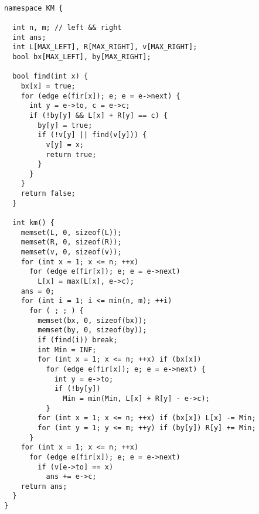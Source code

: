 \begin{lstlisting}

namespace KM {

  int n, m; // left && right
  int ans;
  int L[MAX_LEFT], R[MAX_RIGHT], v[MAX_RIGHT];
  bool bx[MAX_LEFT], by[MAX_RIGHT];

  bool find(int x) {
    bx[x] = true;
    for (edge e(fir[x]); e; e = e->next) {
      int y = e->to, c = e->c;
      if (!by[y] && L[x] + R[y] == c) {
        by[y] = true;
        if (!v[y] || find(v[y])) {
          v[y] = x;
          return true;
        }
      }
    }
    return false;
  }

  int km() {
    memset(L, 0, sizeof(L));
    memset(R, 0, sizeof(R));
    memset(v, 0, sizeof(v));
    for (int x = 1; x <= n; ++x)
      for (edge e(fir[x]); e; e = e->next)
        L[x] = max(L[x], e->c);
    ans = 0;
    for (int i = 1; i <= min(n, m); ++i)
      for ( ; ; ) {
        memset(bx, 0, sizeof(bx));
        memset(by, 0, sizeof(by));
        if (find(i)) break;
        int Min = INF;
        for (int x = 1; x <= n; ++x) if (bx[x])
          for (edge e(fir[x]); e; e = e->next) {
            int y = e->to;
            if (!by[y])
              Min = min(Min, L[x] + R[y] - e->c);
          }
        for (int x = 1; x <= n; ++x) if (bx[x]) L[x] -= Min;
        for (int y = 1; y <= m; ++y) if (by[y]) R[y] += Min;
      }
    for (int x = 1; x <= n; ++x)
      for (edge e(fir[x]); e; e = e->next)
        if (v[e->to] == x)
          ans += e->c;
    return ans;
  }
}

\end{lstlisting}